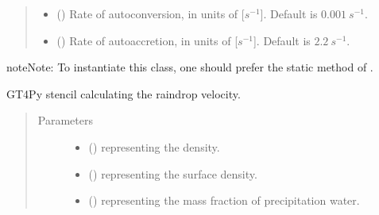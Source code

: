 \documentclass[letterpaper,10pt,english]{sphinxmanual}
\begin{document}
\begin{fulllineitems}
\begin{fulllineitems}
\begin{quote}
\begin{description}
\begin{itemize}
\item {} 
 () \textendash{} Rate of autoconversion, in units of {[}\(s^{-1}\){]}. Default is \(0.001 ~ s^{-1}\).

\item {} 
 () \textendash{} Rate of autoaccretion, in units of {[}\(s^{-1}\){]}. Default is \(2.2 ~ s^{-1}\).

\end{itemize}

\end{description}\end{quote}

\begin{sphinxadmonition}{note}{Note:}
To instantiate this class, one should prefer the static method
 of
.
\end{sphinxadmonition}

\end{fulllineitems}


\begin{fulllineitems}
\label{\detokenize{api:parameterizations.slow_tendency_microphysics_kessler_wrf.SlowTendencyMicrophysicsKesslerWRF._stencil_raindrop_fall_velocity_defs}}
GT4Py stencil calculating the raindrop velocity.
\begin{quote}\begin{description}
\item[{Parameters}] \leavevmode\begin{itemize}
\item {} 
 () \textendash{}  representing the density.

\item {} 
 () \textendash{}  representing the surface density.

\item {} 
 () \textendash{}  representing the mass fraction of precipitation water.


\end{itemize}
\end{description}
\end{quote}
\end{fulllineitems}
\end{fulllineitems}
\end{document}
